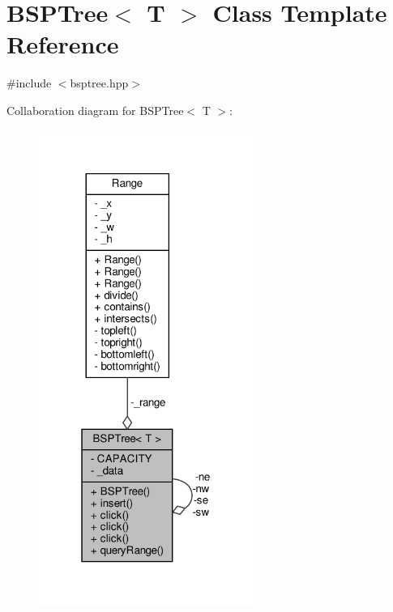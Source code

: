 \hypertarget{classBSPTree}{}\section{B\+S\+P\+Tree$<$ T $>$ Class Template Reference}
\label{classBSPTree}


{\ttfamily \#include $<$bsptree.\+hpp$>$}



Collaboration diagram for B\+S\+P\+Tree$<$ T $>$\+:\nopagebreak
\begin{figure}[H]
\begin{center}
\leavevmode
\includegraphics[width=199pt]{classBSPTree__coll__graph}
\end{center}
\end{figure}
